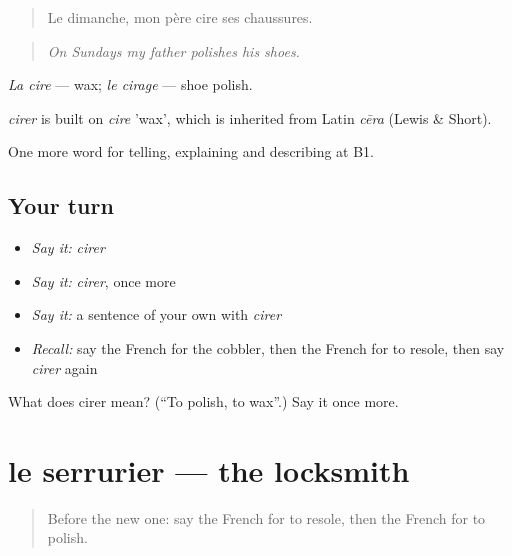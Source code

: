 \begin{quote}
Le dimanche, mon père cire ses chaussures.
\end{quote}

\begin{quote}
\emph{On Sundays my father polishes his shoes.}
\end{quote}

\emph{La cire} — wax; \emph{le cirage} — shoe polish.

\begin{cousinweb}
\emph{cirer} is built on \emph{cire} 'wax', which is inherited from Latin \emph{cēra} (Lewis \& Short).
\end{cousinweb}

\begin{grammarlens}[title={What you've built}]
One more word for telling, explaining and describing at B1.
\end{grammarlens}

\subsection*{Your turn}
\begin{itemize}
\raggedright
  \item \emph{Say it:} \emph{cirer}
  \item \emph{Say it:} \emph{cirer}, once more
  \item \emph{Say it:} a sentence of your own with \emph{cirer}
  \item \emph{Recall:} say the French for the cobbler, then the French for to resole, then say \emph{cirer} again
\end{itemize}

\begin{tcolorbox}[breakable,colback=teal!4,colframe=teal!35!black,title={Before you move on}]
What does cirer mean? (\textquotedblleft{}To polish, to wax\textquotedblright{}.) Say it once more.
\end{tcolorbox}
\section[le serrurier]{le serrurier — the locksmith}

\label{lesson:FR-C446-serrurier}



\begin{quote}
Before the new one: say the French for to resole, then the French for to polish.
\end{quote}

